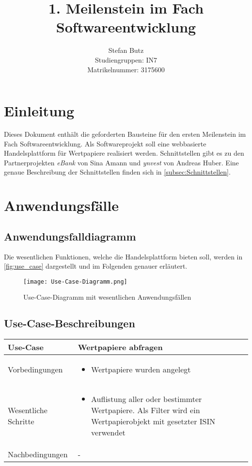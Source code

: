 \documentclass[12pt, a4paper, titlepage]{article}
\newcommand{\andi}[0]{Andreas Huber}
\newcommand{\andiProj}[0]{\textit{ynvest}}
\newcommand{\sina}[0]{Sina Amann}
\newcommand{\sinaProj}[0]{\textit{eBank}}
\begin{document}
\title{1. Meilenstein im Fach Softwareentwicklung}
\author{Stefan Butz \\
		Studiengruppen: IN7 \\
		Matrikelnummer: 3175600}

\maketitle

\section{Einleitung}
Dieses Dokument enthält die geforderten Bausteine für den ersten Meilenstein
im Fach Softwareentwicklung.
Als Softwareprojekt soll eine webbasierte Handelsplattform für Wertpapiere
realisiert werden.
Schnittstellen gibt es zu den Partnerprojekten \sinaProj{} von \sina{}
und \andiProj{} von \andi{}.
Eine genaue Beschreibung der Schnittstellen finden sich in
\autoref{subsec:Schnittstellen}.

\section{Anwendungsfälle}
\label{sec:use_case}
\subsection{Anwendungsfalldiagramm}
Die wesentlichen Funktionen, welche die Handelsplattform  bieten soll, werden in
\autoref{fig:use_case} dargestellt und im Folgenden genauer erläutert.

\begin{figure}[H]
	\centering
    \texttt{[image: Use-Case-Diagramm.png]}
	\caption{Use-Case-Diagramm mit wesentlichen Anwendungsfällen}
	\label{fig:use_case}
\end{figure}

\subsection{Use-Case-Beschreibungen}
\begin{tabular}{|p{}|p{}|}
	\hline
	Use-Case & Wertpapiere abfragen \\
	\hline
	Vorbedingungen &
		\begin{itemize}
			\item Wertpapiere wurden angelegt
		\end{itemize} \\
	\hline
	Wesentliche Schritte &
		\begin{itemize}
			\item Auflistung aller oder bestimmter Wertpapiere.
			Als Filter wird ein Wertpapierobjekt mit gesetzter ISIN verwendet
		\end{itemize} \\
	\hline
	Nachbedingungen & - \\
	\hline
\end{tabular}\par
\end{document}
